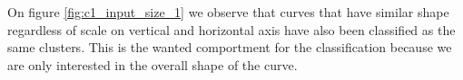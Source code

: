 On figure \ref{fig:c1_input_size_1} we observe that curves that have similar shape regardless of scale on vertical and horizontal axis have also been classified as the same clusters. This is the wanted comportment for the classification because we are only interested in the overall shape of the curve.










